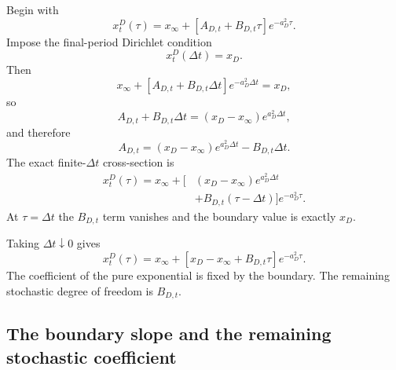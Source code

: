 \documentclass[12pt]{article}
\numberwithin{equation}{subsection}
\begin{document}
Begin with
\begin{equation}
x^D_t(\tau)
=
x_\infty+
\left[A_{D,t}+B_{D,t}\tau\right]e^{-a_D^2\tau}.
\end{equation}
Impose the final-period Dirichlet condition
\begin{equation}
x^D_t(\Delta t)=x_D.
\end{equation}
Then
\begin{equation}
x_\infty+
\left[A_{D,t}+B_{D,t}\Delta t\right]e^{-a_D^2\Delta t}
=x_D,
\end{equation}
so
\begin{equation}
A_{D,t}+B_{D,t}\Delta t
=
(x_D-x_\infty)e^{a_D^2\Delta t},
\end{equation}
and therefore
\begin{equation}
A_{D,t}
=
(x_D-x_\infty)e^{a_D^2\Delta t}-B_{D,t}\Delta t.
\end{equation}
The exact finite-$\Delta t$ cross-section is
\begin{equation}
\begin{aligned}
x^D_t(\tau)
=
x_\infty+
\Big[&(x_D-x_\infty)e^{a_D^2\Delta t}
\\
&+B_{D,t}(\tau-\Delta t)
\Big]e^{-a_D^2\tau}.
\end{aligned}
\end{equation}
At $\tau=\Delta t$ the $B_{D,t}$ term vanishes and the boundary value is exactly $x_D$.

Taking $\Delta t\downarrow0$ gives
\begin{equation}
\boxed{x^D_t(\tau)
=
x_\infty+
\left[x_D-x_\infty+B_{D,t}\tau\right]e^{-a_D^2\tau}.}
\end{equation}
The coefficient of the pure exponential is fixed by the boundary. The remaining stochastic degree of freedom is $B_{D,t}$.

\subsection{The boundary slope and the remaining stochastic coefficient}
\end{document}

